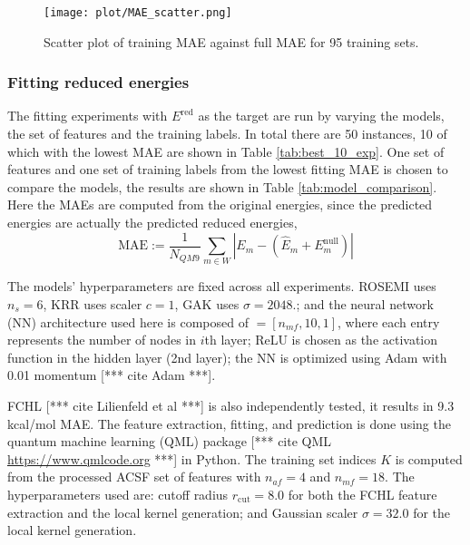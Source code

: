 \documentclass[12pt]{article}
\def\att{                    %
        \marginpar[ \hspace*{\fill} \raisebox{-0.2em}{\rule{2mm}{1.2em}} ]
        {\raisebox{-0.2em}{\rule{2mm}{1.2em}} }
        }
\def\at#1{[*** \att #1 ***]}  %
\begin{document}
\begin{figure}[H]
	\label{fig:atomic_MAE}
	\centering
	\texttt{[image: plot/MAE\_scatter.png]}
	\caption{Scatter plot of training MAE against full MAE for 95 training sets.}
\end{figure}

\subsubsection{Fitting reduced energies}
\label{subsubsec:nullmodelfit}
The fitting experiments with $E^\text{red}$ as the target are run by varying the models, the set of features and the training labels. In total there are 50 instances, 10 of which with the lowest MAE are shown in Table \ref{tab:best_10_exp}.
One set of features and one set of training labels from the lowest fitting MAE is chosen to compare the models, the results are shown in Table \ref{tab:model_comparison}. Here the MAEs are computed from the original energies, since the predicted energies are actually the predicted reduced energies,
\begin{equation}
	\text{MAE} := \frac{1}{N_{QM9}}\sum_{m \in W}|E_{m} - (\hat{E}_m + E^\text{null}_m)|
\end{equation}

The models' hyperparameters are fixed across all experiments. ROSEMI uses $n_s = 6$, KRR uses scaler $c=1$, GAK uses $\sigma = 2048.$; and the neural network (NN) architecture used here is composed of $ = [n_{mf}, 10, 1]$, where each entry represents the number of nodes in $i$th layer; ReLU is chosen as the activation function in the hidden layer (2nd layer); the NN is optimized using Adam with 0.01 momentum \at{cite Adam}. 

FCHL \at{cite Lilienfeld et al} is also independently tested, it results in 9.3 kcal/mol MAE. The feature extraction, fitting, and prediction is done using the quantum machine learning (QML) package \at{cite QML \url{https://www.qmlcode.org}} in Python. 
The training set indices $K$ is computed from the processed ACSF set of features with $n_{af} = 4$ and $n_{mf} = 18$.
The hyperparameters used are: cutoff radius $r_\text{cut} = 8.0$ for both the FCHL feature extraction and the local kernel generation; and Gaussian scaler $\sigma = 32.0$ for the local kernel generation.
\end{document}
